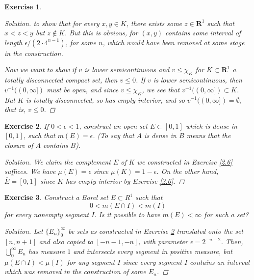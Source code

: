 \documentclass[10pt,letterpaper]{amsart}
\newtheorem{exercise}{Exercise}[section]
\theoremstyle{definition}
\theoremstyle{remark}
\numberwithin{equation}{exercise}
\begin{document}
\begin{multicols}{2}
\begin{exercise}
\begin{proof}[Solution]
      \cite[Thm.\ 2.47]{Rud76} to show that for every
      $x,y \in K$, there exists some $z \in \mathbf{R}^1$ such that $x < z < y$
      but $z \notin K$. But this is obvious, for $(x,y)$ contains some interval
      of length $\epsilon/(2 \cdot 4^{n-1})$, for some $n$, which would have been
      removed at some stage in the construction.
      \par Now we want to show if $v$ is lower semicontinuous and $v \le \chi_K$
      for $K \subset \mathbf{R}^1$ a totally disconnected compact set, then $v
      \le 0$. If $v$ is lower semicontinuous, then $v^{-1}((0,\infty])$
      must be open, and since $v \le \chi_K$, we see that $v^{-1}((0,\infty])
      \subset K$. But $K$ is totally disconnected, so has empty interior, and so
      $v^{-1}((0,\infty]) = \emptyset$, that is, $v \le 0$.
    \end{proof}
  \end{exercise}
  \begin{exercise}\label{2.7}
    If $0 < \epsilon < 1$, construct an open set $E \subset [0,1]$ which is
    dense in $[0,1]$, such that $m(E) = \epsilon$. (To say that $A$ is dense in
    $B$ means that the closure of $A$ contains $B$).
    \begin{proof}[Solution]
      We claim the complement $E$ of $K$ we constructed in Exercise \ref{2.6}
      suffices. We have $\mu(E) = \epsilon$ since $\mu(K) = 1 - \epsilon$. On
      the other hand, $\overline{E} = [0,1]$ since $K$ has empty interior by
      Exercise \ref{2.6}.
    \end{proof}
  \end{exercise}
  \begin{exercise}
    Construct a Borel set $E \subset R^1$ such that
    \begin{equation*}
      0 < m(E \cap I) < m(I)
    \end{equation*}
    for every nonempty segment $I$. Is it possible to have $m(E) < \infty$ for
    such a set?
    \begin{proof}[Solution]
      Let $\{E_n\}_0^\infty$ be sets as constructed in Exercise \ref{2.7}
      translated onto the set $[n,n+1]$ and also copied to $[-n-1,-n]$, with
      parameter $\epsilon = 2^{-n-2}$. Then, $\bigcup_0^\infty E_n$ has measure $1$
      and intersects every segment in positive measure, but $\mu(E \cap I) <
      \mu(I)$ for any segment $I$ since every segment $I$ contains an interval
      which was removed in the construction of some $E_n$.
    \end{proof}
  \end{exercise}

\end{multicols}
\end{document}
